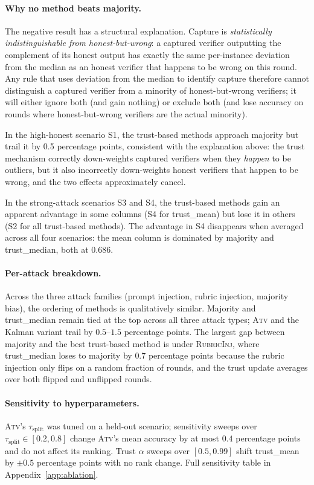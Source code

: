 \documentclass[11pt]{article}
\begin{document}
\paragraph{Why no method beats majority.}
The negative result has a structural explanation. Capture is
\emph{statistically indistinguishable from honest-but-wrong}: a
captured verifier outputting the complement of its honest output has
exactly the same per-instance deviation from the median as an honest
verifier that happens to be wrong on this round. Any rule that uses
deviation from the median to identify capture therefore cannot
distinguish a captured verifier from a minority of honest-but-wrong
verifiers; it will either ignore both (and gain nothing) or exclude
both (and lose accuracy on rounds where honest-but-wrong verifiers
are the actual minority).

In the high-honest scenario S1, the trust-based methods approach
majority but trail it by 0.5 percentage points, consistent with the
explanation above: the trust mechanism correctly down-weights
captured verifiers when they \emph{happen} to be outliers, but it
also incorrectly down-weights honest verifiers that happen to be
wrong, and the two effects approximately cancel.

In the strong-attack scenarios S3 and S4, the trust-based methods
gain an apparent advantage in some columns (S4 for trust\_mean) but
lose it in others (S2 for all trust-based methods). The advantage in
S4 disappears when averaged across all four scenarios: the mean
column is dominated by majority and trust\_median, both at $0.686$.

\paragraph{Per-attack breakdown.}
Across the three attack families (prompt injection, rubric injection,
majority bias), the ordering of methods is qualitatively similar.
Majority and trust\_median remain tied at the top across all three
attack types; \textsc{Atv} and the Kalman variant trail by $0.5$--$1.5$
percentage points. The largest gap between majority and the best
trust-based method is under \textsc{RubricInj}, where trust\_median
loses to majority by $0.7$ percentage points because the rubric
injection only flips on a random fraction of rounds, and the trust
update averages over both flipped and unflipped rounds.

\paragraph{Sensitivity to hyperparameters.}
\textsc{Atv}'s $\tau_{\text{split}}$ was tuned on a held-out scenario;
sensitivity sweeps over $\tau_{\text{split}} \in [0.2, 0.8]$ change
\textsc{Atv}'s mean accuracy by at most $0.4$ percentage points and
do not affect its ranking. Trust $\alpha$ sweeps over $[0.5, 0.99]$
shift trust\_mean by $\pm 0.5$ percentage points with no rank
change. Full sensitivity table in
Appendix~\ref{app:ablation}.
\end{document}
